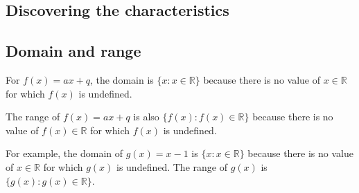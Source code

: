 \subsection*{Discovering the characteristics} 

\subsection*{Domain and range}
\nopagebreak
For $f(x)=ax+q$, the domain is $\{x:x\in \mathbb{R}\}$ because there is no value of $x\in \mathbb{R}$ for which $f(x)$ is undefined.\par 
The range of $f(x)=ax+q$ is also $\{f(x):f(x)\in \mathbb{R}\}$ because there is no value of $f(x)\in \mathbb{R}$ for which $f(x)$ is undefined.\par 
For example, the domain of $g(x)=x-1$ is $\{x:x\in \mathbb{R}\}$ because there is no value of $x\in \mathbb{R}$ for which $g(x)$ is undefined. The range of $g(x)$ is $\{g(x):g(x)\in \mathbb{R}\}$.\par 


